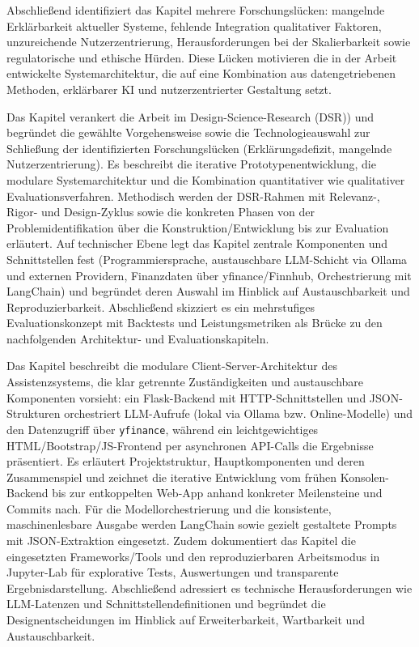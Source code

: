 Abschließend identifiziert das Kapitel mehrere Forschungslücken:
mangelnde Erklärbarkeit aktueller Systeme, fehlende Integration qualitativer Faktoren, unzureichende Nutzerzentrierung, Herausforderungen bei der Skalierbarkeit sowie regulatorische und ethische Hürden.
Diese Lücken motivieren die in der Arbeit entwickelte Systemarchitektur, die auf eine Kombination aus datengetriebenen Methoden, erklärbarer KI und nutzerzentrierter Gestaltung setzt.


Das Kapitel \textbf{} verankert die Arbeit im Design-Science-Research (\acs{DSR})) und begründet die gewählte Vorgehensweise sowie die Technologieauswahl zur Schließung der identifizierten Forschungslücken (Erklärungsdefizit, mangelnde Nutzerzentrierung).
Es beschreibt die iterative Prototypenentwicklung, die modulare Systemarchitektur und die Kombination quantitativer wie qualitativer Evaluationsverfahren.
Methodisch werden der \acs{DSR}-Rahmen mit Relevanz-, Rigor- und Design-Zyklus sowie die konkreten Phasen von der Problemidentifikation über die Konstruktion/Entwicklung bis zur Evaluation erläutert.
Auf technischer Ebene legt das Kapitel zentrale Komponenten und Schnittstellen fest (Programmiersprache, austauschbare \acs{LLM}-Schicht via Ollama und externen Providern, Finanzdaten über yfinance/Finnhub, Orchestrierung mit LangChain) und begründet deren Auswahl im Hinblick auf Austauschbarkeit und Reproduzierbarkeit.
Abschließend skizziert es ein mehrstufiges Evaluationskonzept mit Backtests und Leistungsmetriken als Brücke zu den nachfolgenden Architektur- und Evaluationskapiteln.


Das Kapitel \textbf{} beschreibt die modulare Client-Server-Architektur des Assistenzsystems, die klar getrennte Zuständigkeiten und austauschbare Komponenten vorsieht: ein Flask-Backend mit \acs{HTTP}-Schnittstellen und JSON-Strukturen orchestriert \acs{LLM}-Aufrufe (lokal via Ollama bzw. Online-Modelle) und den Datenzugriff über \texttt{yfinance}, während ein leichtgewichtiges \acs{HTML}/Bootstrap/\acs{JS}-Frontend per asynchronen \acs{API}-Calls die Ergebnisse präsentiert.
Es erläutert Projektstruktur, Hauptkomponenten und deren Zusammenspiel und zeichnet die iterative Entwicklung vom frühen Konsolen-Backend bis zur entkoppelten Web-App anhand konkreter Meilensteine und Commits nach.
Für die Modellorchestrierung und die konsistente, maschinenlesbare Ausgabe werden LangChain sowie gezielt gestaltete Prompts mit \acs{JSON}-Extraktion eingesetzt.
Zudem dokumentiert das Kapitel die eingesetzten Frameworks/Tools und den reproduzierbaren Arbeitsmodus in Jupyter-Lab für explorative Tests, Auswertungen und transparente Ergebnisdarstellung.
Abschließend adressiert es technische Herausforderungen wie \acs{LLM}-Latenzen und Schnittstellendefinitionen und begründet die Designentscheidungen im Hinblick auf Erweiterbarkeit, Wartbarkeit und Austauschbarkeit.


